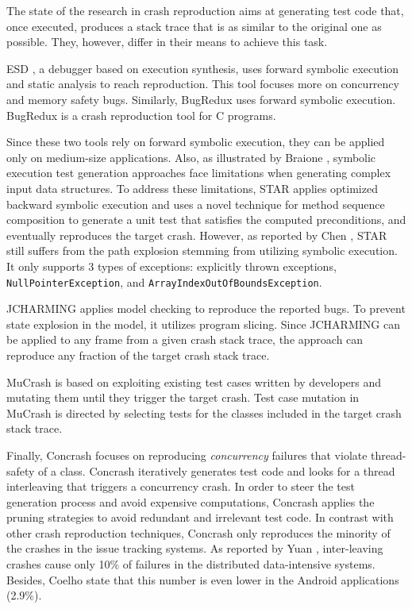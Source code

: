 The state of the research in crash reproduction \cite{Zamfir2010, jin2012bugredux, BPT17concrash, soltani2017, Nayrolles2017, Xuan2015, Chen2015} aims at generating test code that, once executed, produces a stack trace that is as similar to the original one as possible. They, however, differ in their means to achieve this task. 

\textrm{ESD} \cite{Zamfir2010}, a debugger based on execution synthesis, uses forward symbolic execution and static analysis to reach reproduction. This tool focuses more on concurrency and memory safety bugs.
Similarly, \textrm{BugRedux} \cite{jin2012bugredux} uses forward symbolic execution. \textrm{BugRedux} is a crash reproduction tool for C programs.

Since these two tools rely on forward symbolic execution, they can be applied only on medium-size applications. Also, as illustrated by Braione \etal \cite{braione2017tardis}, symbolic execution test generation approaches face limitations when generating complex input data structures.
To address these limitations, \textrm{STAR} \cite{Chen2015} applies optimized backward symbolic execution and uses a novel technique for method sequence composition to generate a unit test that satisfies the computed preconditions, and eventually reproduces the target crash. 
However, as reported by Chen \etal \cite{Chen2015}, \textrm{STAR} still suffers from the path explosion stemming from utilizing symbolic execution. 
It only supports 3 types of exceptions: explicitly thrown exceptions, \texttt{NullPointerException}, and \texttt{ArrayIndexOutOfBoundsException}.  

\textrm{JCHARMING} \cite{Nayrolles2017} applies model checking to reproduce the reported bugs. To prevent state explosion in the model, it utilizes program slicing.
Since \textrm{JCHARMING} can be applied to any frame from a given crash stack trace, the approach can reproduce any fraction of the target crash stack trace. 

\textrm{MuCrash} \cite{Xuan2015} is based on exploiting existing test cases written by developers and mutating them until they trigger the target crash.
Test case mutation in \textrm{MuCrash} is directed by selecting tests for the classes included in the target crash stack trace. 

Finally, \textrm{Concrash} \cite{BPT17concrash} focuses on reproducing \textit{concurrency} failures that violate thread-safety of a class.
\textrm{Concrash} iteratively generates test code and looks for a thread interleaving that triggers a concurrency crash.
In order to steer the test generation process and avoid expensive computations, \textrm{Concrash} applies the pruning strategies to avoid redundant and irrelevant test code. In contrast with other crash reproduction techniques, \textrm{Concrash} only reproduces the minority of the crashes in the issue tracking systems. As reported by Yuan \etal \cite{Yuan2014}, inter-leaving crashes cause only 10\% of failures in the distributed data-intensive systems. Besides, Coelho \etal \cite{Coelho2015} state that this number is even lower in the Android applications (2.9\%).

